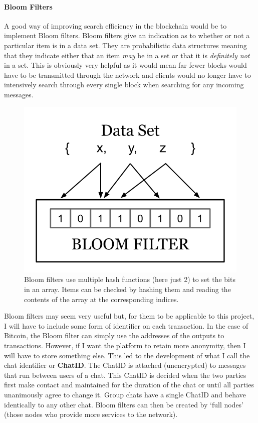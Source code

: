 \documentclass{article}
\begin{document}
\paragraph{Bloom Filters}
A good way of improving search efficiency in the blockchain would be to implement Bloom filters. Bloom filters give an indication as to whether or not a particular item is in a data set. They are probabilistic data structures meaning that they indicate either that an item \textit{may} be in a set or that it is \textit{definitely not} in a set. This is obviously very helpful as it would mean far fewer blocks would have to be transmitted through the network and clients would no longer have to intensively search through every single block when searching for any incoming messages.
\begin{figure}[h]
    \centering
    \includegraphics[width=0.5\linewidth]{Images/Diagrams/bloom_filters.png}
    \caption{Bloom filters use multiple hash functions (here just 2) to set the bits in an array. Items can be checked by hashing them and reading the contents of the array at the corresponding indices.}
    \label{fig:bfs}
\end{figure}

Bloom filters may seem very useful but, for them to be applicable to this project, I will have to include some form of identifier on each transaction. In the case of Bitcoin, the Bloom filter can simply use the addresses of the outputs to transactions. However, if I want the platform to retain more anonymity, then I will have to store something else.
This led to the development of what I call the chat identifier or \textbf{ChatID}. The ChatID is attached (unencrypted) to messages that run between users of a chat. This ChatID is decided when the two parties first make contact and maintained for the duration of the chat or until all parties unanimously agree to change it. Group chats have a single ChatID and behave identically to any other chat. Bloom filters can then be created by `full nodes' (those nodes who provide more services to the network).
\end{document}
